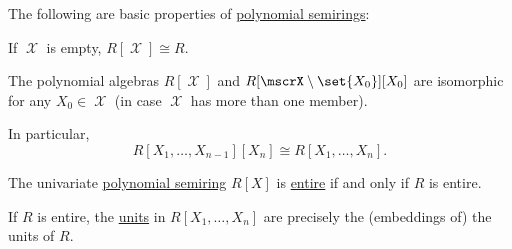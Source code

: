 \begin{proposition}\label{thm:def:polynomial_algebra}
  The following are basic properties of \hyperref[def:polynomial_algebra]{polynomial semirings}:
  \begin{thmenum}
     If \( \mscrX \) is empty, \( R[\mscrX] \cong R \).

     The polynomial algebras \( R[\mscrX] \) and \( R[\mscrX \setminus \set{ X_0 }][X_0] \) are isomorphic for any \( X_0 \in \mscrX \) (in case \( \mscrX \) has more than one member).

    In particular,
    \begin{equation*}
      R[X_1, \ldots, X_{n-1}][X_n] \cong R[X_1, \ldots, X_n].
    \end{equation*}

     The univariate \hyperref[def:polynomial_algebra]{polynomial semiring} \( R[X] \) is \hyperref[def:divisibility/zero]{entire} if and only if \( R \) is entire.

     If \( R \) is entire, the \hyperref[def:divisibility/unit]{units} in \( R[X_1, \ldots, X_n] \) are precisely the (embeddings of) the units of \( R \).
  \end{thmenum}
\end{proposition}
